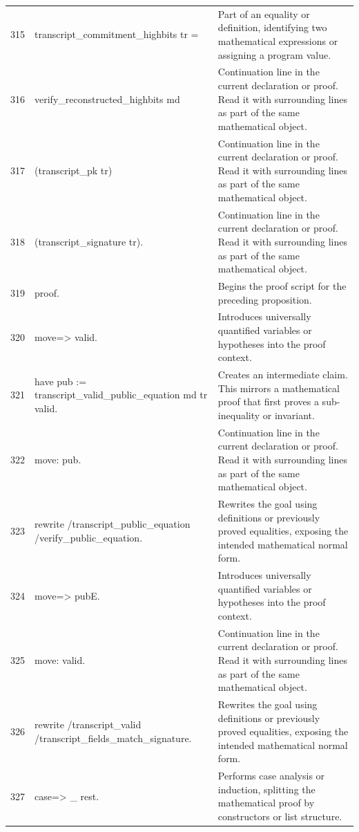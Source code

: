 \documentclass[10pt]{article}
\begin{document}
\begin{longtable}{r L{0.53\textwidth} L{0.37\textwidth}}
315 & {\ttfamily\scriptsize   transcript\_commitment\_highbits tr =} & Part of an equality or definition, identifying two mathematical expressions or assigning a program value. \\
316 & {\ttfamily\scriptsize     verify\_reconstructed\_highbits md} & Continuation line in the current declaration or proof.  Read it with surrounding lines as part of the same mathematical object. \\
317 & {\ttfamily\scriptsize       (transcript\_pk tr)} & Continuation line in the current declaration or proof.  Read it with surrounding lines as part of the same mathematical object. \\
318 & {\ttfamily\scriptsize       (transcript\_signature tr).} & Continuation line in the current declaration or proof.  Read it with surrounding lines as part of the same mathematical object. \\
319 & {\ttfamily\scriptsize proof.} & Begins the proof script for the preceding proposition. \\
320 & {\ttfamily\scriptsize move=> valid.} & Introduces universally quantified variables or hypotheses into the proof context. \\
321 & {\ttfamily\scriptsize have pub := transcript\_valid\_public\_equation md tr valid.} & Creates an intermediate claim.  This mirrors a mathematical proof that first proves a sub-inequality or invariant. \\
322 & {\ttfamily\scriptsize move: pub.} & Continuation line in the current declaration or proof.  Read it with surrounding lines as part of the same mathematical object. \\
323 & {\ttfamily\scriptsize rewrite /transcript\_public\_equation /verify\_public\_equation.} & Rewrites the goal using definitions or previously proved equalities, exposing the intended mathematical normal form. \\
324 & {\ttfamily\scriptsize move=> pubE.} & Introduces universally quantified variables or hypotheses into the proof context. \\
325 & {\ttfamily\scriptsize move: valid.} & Continuation line in the current declaration or proof.  Read it with surrounding lines as part of the same mathematical object. \\
326 & {\ttfamily\scriptsize rewrite /transcript\_valid /transcript\_fields\_match\_signature.} & Rewrites the goal using definitions or previously proved equalities, exposing the intended mathematical normal form. \\
327 & {\ttfamily\scriptsize case=> \_ rest.} & Performs case analysis or induction, splitting the mathematical proof by constructors or list structure. \\

\end{longtable}
\end{document}
